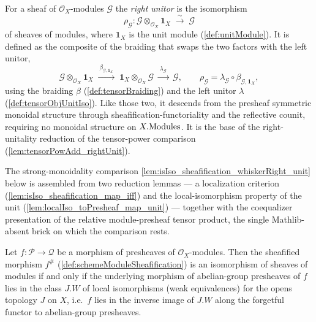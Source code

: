 \begin{definition}

  \label{def:tensorObjRightUnitor}
  For a sheaf of \(\mathcal{O}_X\)-modules \(\mathcal{G}\) the \emph{right unitor}
  is the isomorphism
  \[
    \rho_{\mathcal{G}} :
      \mathcal{G} \otimes_{\mathcal{O}_X} \mathbf{1}_X
      \;\xrightarrow{\ \sim\ }\; \mathcal{G}
  \]
  of sheaves of modules, where \(\mathbf{1}_X\) is the unit module
  (\cref{def:unitModule}). It is defined as the composite of the braiding that
  swaps the two factors with the left unitor,
  \[
    \mathcal{G} \otimes_{\mathcal{O}_X} \mathbf{1}_X
      \;\xrightarrow{\ \beta_{\mathcal{G}, \mathbf{1}_X}\ }\;
      \mathbf{1}_X \otimes_{\mathcal{O}_X} \mathcal{G}
      \;\xrightarrow{\ \lambda_{\mathcal{G}}\ }\;
      \mathcal{G},
    \qquad
    \rho_{\mathcal{G}}
      = \lambda_{\mathcal{G}} \circ \beta_{\mathcal{G}, \mathbf{1}_X},
  \]
  using the braiding \(\beta\) (\cref{def:tensorBraiding}) and the left unitor
  \(\lambda\) (\cref{def:tensorObjUnitIso}). Like those two, it descends from the
  presheaf symmetric monoidal structure through sheafification-functoriality and
  the reflective counit, requiring no monoidal structure on \(X.\mathrm{Modules}\). It is
  the base of the right-unitality reduction of the tensor-power comparison
  (\cref{lem:tensorPowAdd_rightUnit}).
\end{definition}





The strong-monoidality comparison \cref{lem:isIso_sheafification_whiskerRight_unit}
below is assembled from two reduction lemmas --- a localization criterion
(\cref{lem:isIso_sheafification_map_iff}) and the local-isomorphism property of
the unit (\cref{lem:localIso_toPresheaf_map_unit}) --- together with the
coequalizer presentation of the relative module-presheaf tensor product, the single
Mathlib-absent brick on which the comparison rests.

\begin{lemma}
  \label{lem:isIso_sheafification_map_iff}
  Let \(f : \mathcal{P} \to \mathcal{Q}\) be a morphism of presheaves of
  \(\mathcal{O}_X\)-modules. Then the sheafified morphism \(f^{\#}\)
  (\cref{def:schemeModuleSheafification}) is an isomorphism of sheaves of modules
  if and only if the underlying morphism of abelian-group presheaves of \(f\)
  lies in the class \(J.W\) of local isomorphisms (weak equivalences) for the
  opens topology \(J\) on \(X\), i.e.\ \(f\) lies in the inverse image of \(J.W\)
  along the forgetful functor to abelian-group presheaves.
\end{lemma}

